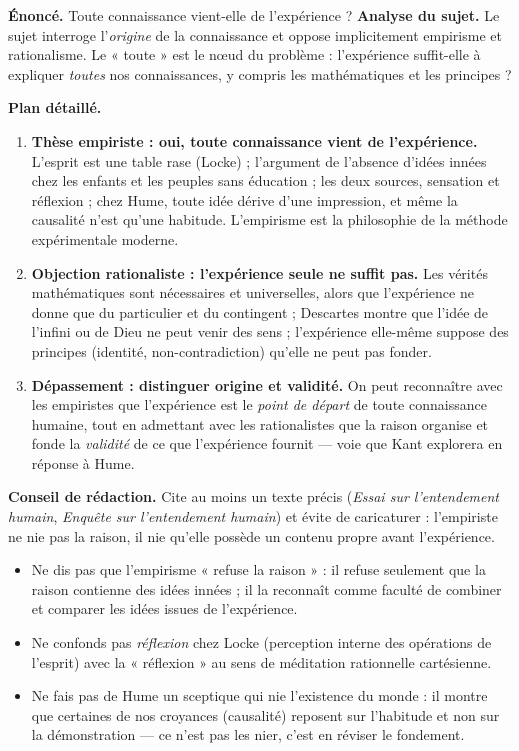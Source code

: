 \documentclass[11pt]{article}
\begin{document}
\begin{exoresolu}
\textbf{Énoncé.} Toute connaissance vient-elle de l'expérience ?
\tcblower
\textbf{Analyse du sujet.} Le sujet interroge l'\emph{origine} de la connaissance et oppose implicitement empirisme et rationalisme. Le « toute » est le nœud du problème : l'expérience suffit-elle à expliquer \emph{toutes} nos connaissances, y compris les mathématiques et les principes ?

\textbf{Plan détaillé.}
\begin{enumerate}
\item \textbf{Thèse empiriste : oui, toute connaissance vient de l'expérience.} L'esprit est une table rase (Locke) ; l'argument de l'absence d'idées innées chez les enfants et les peuples sans éducation ; les deux sources, sensation et réflexion ; chez Hume, toute idée dérive d'une impression, et même la causalité n'est qu'une habitude. L'empirisme est la philosophie de la méthode expérimentale moderne.
\item \textbf{Objection rationaliste : l'expérience seule ne suffit pas.} Les vérités mathématiques sont nécessaires et universelles, alors que l'expérience ne donne que du particulier et du contingent ; Descartes montre que l'idée de l'infini ou de Dieu ne peut venir des sens ; l'expérience elle-même suppose des principes (identité, non-contradiction) qu'elle ne peut pas fonder.
\item \textbf{Dépassement : distinguer origine et validité.} On peut reconnaître avec les empiristes que l'expérience est le \emph{point de départ} de toute connaissance humaine, tout en admettant avec les rationalistes que la raison organise et fonde la \emph{validité} de ce que l'expérience fournit — voie que Kant explorera en réponse à Hume.
\end{enumerate}
\textbf{Conseil de rédaction.} Cite au moins un texte précis (\emph{Essai sur l'entendement humain}, \emph{Enquête sur l'entendement humain}) et évite de caricaturer : l'empiriste ne nie pas la raison, il nie qu'elle possède un contenu propre avant l'expérience.
\end{exoresolu}

\begin{attention}
\begin{itemize}
\item Ne dis pas que l'empirisme « refuse la raison » : il refuse seulement que la raison contienne des idées innées ; il la reconnaît comme faculté de combiner et comparer les idées issues de l'expérience.
\item Ne confonds pas \emph{réflexion} chez Locke (perception interne des opérations de l'esprit) avec la « réflexion » au sens de méditation rationnelle cartésienne.
\item Ne fais pas de Hume un sceptique qui nie l'existence du monde : il montre que certaines de nos croyances (causalité) reposent sur l'habitude et non sur la démonstration — ce n'est pas les nier, c'est en réviser le fondement.
\end{itemize}
\end{attention}
\end{document}
